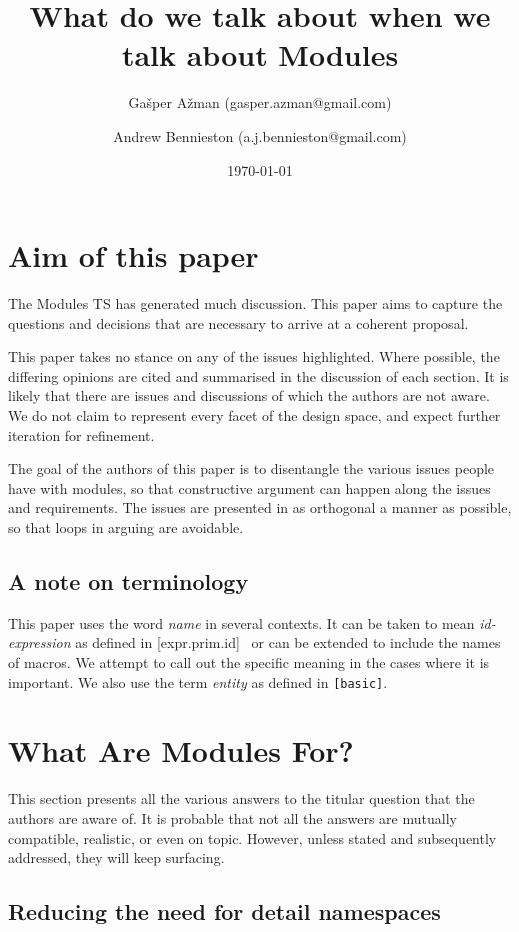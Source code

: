 \documentclass[reqno]{article}
\title{What do we talk about when we talk about Modules}
\author{Gašper Ažman \small{(gasper.azman@gmail.com)}
\and Andrew Bennieston \small{(a.j.bennieston@gmail.com)}}
\date{\today}
\begin{document}
\maketitle
\section{Aim of this paper}

The Modules TS \citep{N4647} has generated much discussion. This paper aims to
capture the questions and decisions that are necessary to arrive at a coherent
proposal.

This paper takes no stance on any of the issues highlighted. Where possible,
the differing opinions are cited and summarised in the discussion of each
section. It is likely that there are issues and discussions of which the
authors are not aware. We do not claim to represent every facet of the design
space, and expect further iteration for refinement.

The goal of the authors of this paper is to disentangle the various issues
people have with modules, so that constructive argument can happen along the
issues and requirements. The issues are presented in as orthogonal a manner as
possible, so that loops in arguing are avoidable.

\subsection{A note on terminology}

This paper uses the word \emph{name} in several contexts. It can be taken to
mean \emph{id-expression} as defined in [expr.prim.id]~\citep{N4659} or can
be extended to include the names of macros. We attempt to call out the specific
meaning in the cases where it is important. We also use the term \emph{entity}
as defined in \texttt{[basic]}.~\citep{N4659}

\section{What Are Modules For?}

This section presents all the various answers to the titular question that the
authors are aware of. It is probable that not all the answers are mutually
compatible, realistic, or even on topic. However, unless stated and
subsequently addressed, they will keep surfacing.


\subsection{Reducing the need for detail namespaces}
\end{document}
